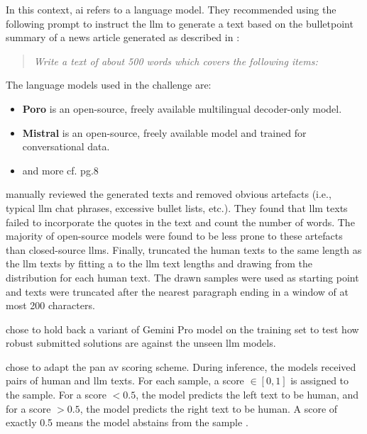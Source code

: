 In this context, \ac{ai} refers to a language model.
They recommended using the following prompt to instruct the \ac{llm} to generate a text 
based on the bulletpoint summary of a news article generated as described in \cite{bevendorff_overview_2024}:
\begin{quote}
    \textit{Write a text of about 500 words which covers the following items:}
\end{quote}
The language models used in the challenge are:
\begin{itemize}
    \item \textbf{Poro} is an open-source, freely available multilingual decoder-only model.
    \item \textbf{Mistral} is an open-source, freely available model and trained for conversational data.
    \item and more cf. pg.8 \cite{bevendorff_overview_2024}
\end{itemize}
\citet{bevendorff_overview_2024} manually reviewed the generated texts and removed obvious artefacts 
(i.e., typical \ac{llm} chat phrases, excessive bullet lists, etc.).
They found that \ac{llm} texts failed to incorporate the quotes in the text and count the number of words.
The majority of open-source models were found to be less prone to these artefacts than closed-source \acp{llm}.
Finally, \citet{bevendorff_overview_2024} truncated the human texts to the same length as the \ac{llm} texts by 
fitting a  to the \ac{llm} text lengths and drawing from the distribution for each human text.
The drawn samples were used as starting point and texts were truncated after the nearest paragraph ending in a window of at most 200 characters.

\citet{bevendorff_overview_2024} chose to hold back a variant of Gemini Pro model on the training set to test 
how robust submitted solutions are against the unseen \ac{llm} models.

\citet{bevendorff_overview_2024} chose to adapt the \ac{pan} \ac{av} scoring scheme.
During inference, the models received pairs of human and \ac{llm} texts.
For each sample, a score $\in [0, 1]$ is assigned to the sample.
For a score $<0.5$, the model predicts the left text to be human,
and for a score $>0.5$, the model predicts the right text to be human.
A score of exactly 0.5 means the model abstains from the sample \cite{bevendorff_overview_2024,kocher_unine_2015}.

